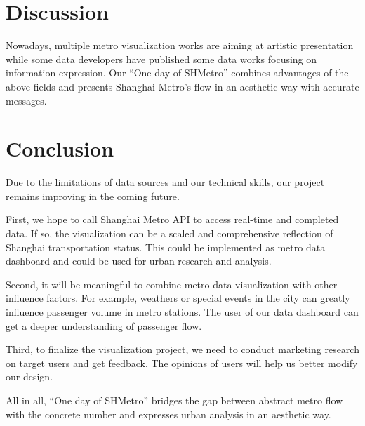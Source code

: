 \documentclass{proc}
\begin{document}
\section{Discussion}
Nowadays, multiple metro visualization works are aiming at artistic presentation while some data developers have published some data works focusing on information expression. Our “One day of SHMetro” combines advantages of the above fields and presents Shanghai Metro’s flow in an aesthetic way with accurate messages.

\section{Conclusion}
Due to the limitations of data sources and our technical skills, our project remains improving in the coming future. 

First, we hope to call Shanghai Metro API to access real-time and completed data. If so, the visualization can be a scaled and comprehensive reflection of Shanghai transportation status. This could be implemented as metro data dashboard and could be used for urban research and analysis. 

Second, it will be meaningful to combine metro data visualization with other influence factors. For example, weathers or special events in the city can greatly influence passenger volume in metro stations. The user of our data dashboard can get a deeper understanding of passenger flow.

Third, to finalize the visualization project, we need to conduct marketing research on target users and get feedback. The opinions of users will help us better modify our design. 

All in all, “One day of SHMetro” bridges the gap between abstract metro flow with the concrete number and expresses urban analysis in an aesthetic way. 




\end{document}
